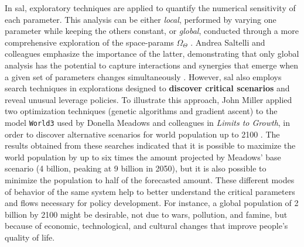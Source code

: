 \documentclass[./main_en.tex]{subfiles}
\begin{document}
\par In \gls{sal}, exploratory techniques are applied to quantify the numerical sensitivity of each parameter. This analysis can be either \textit{local}, performed by varying one parameter while keeping the others constant, or \textit{global}, conducted through a more comprehensive exploration of the \gls{space-params} $\Omega_{\Theta}$ \cite{Saltelli2006}. Andrea Saltelli and colleagues emphasize the importance of the latter, demonstrating that only global analysis has the potential to capture interactions and synergies that emerge when a given set of \gls{parameters} changes simultaneously \cite{Saltelli2019}. However, \gls{sal} also employs search techniques in explorations designed to \textbf{discover critical scenarios} and reveal unusual leverage policies. To illustrate this approach, John Miller applied two optimization techniques (genetic algorithms and gradient ascent) to the \gls{model} \texttt{World3} used by Donella Meadows and colleagues in \textit{Limits to Growth}, in order to discover alternative scenarios for world population up to 2100 \cite{miller1998}. The results obtained from these searches indicated that it is possible to maximize the world population by up to six times the amount projected by Meadows' base scenario (4 billion, peaking at 9 billion in 2050), but it is also possible to minimize the population to half of the forecasted amount. These different modes of behavior of the same \gls{system} help to better understand the critical \gls{parameters} and flows necessary for policy development. For instance, a global population of 2 billion by 2100 might be desirable, not due to wars, pollution, and famine, but because of economic, technological, and cultural changes that improve people's quality of life.
\end{document}
